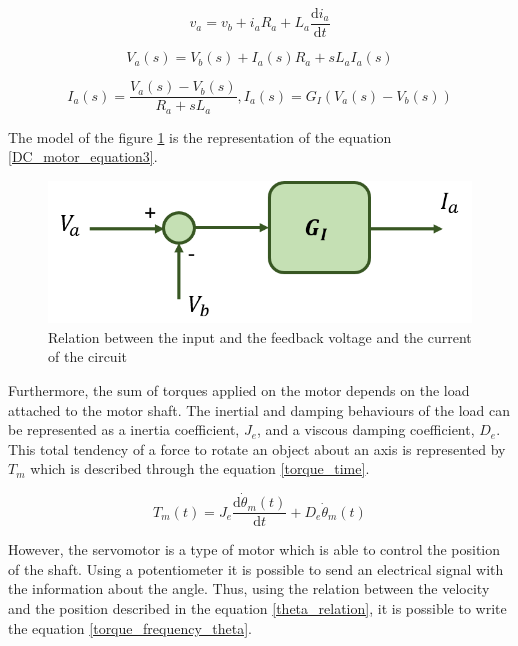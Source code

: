 \begin{equation}\label{DC_motor_equation1}
v_{a}= v_{b}+i_{a} R_{a}+L_{a}\frac{\mathrm{d} i_{a}}{\mathrm{d} t}
\end{equation}

\begin{equation}\label{DC_motor_equation2}
V_{a}(s)= V_{b}(s)+I_{a}(s) R_{a}+sL_{a}I_{a}(s)
\end{equation}

\begin{equation}\label{DC_motor_equation3}
I_{a}(s)= \frac{V_{a}(s)-V_{b}(s)}{R_{a}+sL_{a}} , I_{a}(s)= G_{I}(V_{a}(s)-V_{b}(s))
\end{equation}

The model of the figure \ref{model1} is the representation of the equation \ref{DC_motor_equation3}.

\begin{figure}[H]
\centering
\includegraphics[scale=0.6]{figures/model1.png}
\caption{Relation between the input and the feedback voltage and the current of the circuit}
\label{model1}
\end{figure}

Furthermore, the sum of torques applied on the motor depends on the load attached to the motor shaft. The inertial and damping behaviours of the load can be represented as a inertia coefficient, $J_{e}$, and a viscous damping coefficient, $D_{e}$. This total tendency of a force to rotate an object about an axis is represented by $T_{m}$ which is described through the equation \ref{torque_time}. 

\begin{equation}\label{torque_time}
T_{m}(t)= J_{e}\frac{\mathrm{d} \dot{\theta}_{m}(t)}{\mathrm{d} t}+D_{e}\dot{\theta}_{m}(t)
\end{equation}

However, the servomotor is a type of motor which is able to control the position of the shaft. Using a potentiometer it is possible to send an electrical signal with the information about the angle. Thus, using the relation between the velocity and the position described in the equation \ref{theta_relation}, it is possible to write the equation \ref{torque_frequency_theta}.

